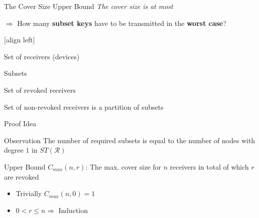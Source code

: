 \documentclass[10pt]{beamer}
\begin{document}
\begin{frame}{The Cover Size Upper Bound}
  \textit{The cover size is at most}
  \begin{center}
  \end{center}
  \pause

  $\Rightarrow$ How many \textbf{subset keys} have to be transmitted in the \textbf{worst case}?
  \pause

  \vspace{1em}

  [align left]
  \begin{description}
    \item[$\mathcal{N}$] Set of receivers (devices)
    \item[$S_1, ..., S_w$, $S_j \subseteq \mathcal{N}$] Subsets
    \item[$\mathcal{R}$] Set of revoked receivers
    \item[$\mathcal{N}\setminus\mathcal{R} = \bigcup_{j=1}^{m} S_{i_j}$] Set of non-revoked receivers is a partition of subsets
    \item[$n = \left\vert{\mathcal{N}}\right\vert$]
    \item[$r = \left\vert{\mathcal{R}}\right\vert$]
  \end{description}

\end{frame}

\begin{frame}{Proof Idea}
\begin{block}{Observation}
\alert{The number of required subsets is equal to the number of nodes with degree $1$ in $ST(\mathcal{R})$}
\end{block}
\vskip 1cm

\begin{block}{Upper Bound $C_{max}(n,r)$:}
The max. cover size for $n$ receivers in total of which $r$ are revoked
\begin{itemize}
  \item Trivially $C_{max}(n,0) = 1$
  \item $0 < r \leq n \Longrightarrow$ Induction
\end{itemize}
\end{block}

\end{frame}
\end{document}
